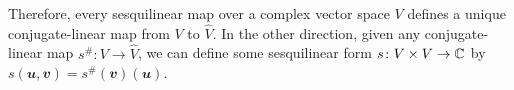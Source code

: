 \documentclass[math, code]{amznotes}
\makeatletter
\let\save@mathaccent\mathaccent
\newcommand*\if@single[3]{%
  \setbox0\hbox{${\mathaccent"0362{#1}}^H$}%
  \setbox2\hbox{${\mathaccent"0362{\kern0pt#1}}^H$}%
  \ifdim\ht0=\ht2 #3\else #2\fi
  }
\newcommand*\rel@kern[1]{\kern#1\dimexpr\macc@kerna}
\newcommand*\widebar[1]{\@ifnextchar^{{\wide@bar{#1}{0}}}{\wide@bar{#1}{1}}}
\newcommand*\wide@bar[2]{\if@single{#1}{\wide@bar@{#1}{#2}{1}}{\wide@bar@{#1}{#2}{2}}}
\newcommand*\wide@bar@[3]{%
  \begingroup
  \def\mathaccent##1##2{%
    \let\mathaccent\save@mathaccent
    \if#32 \let\macc@nucleus\first@char \fi
    \setbox\z@\hbox{$\macc@style{\macc@nucleus}_{}$}%
    \setbox\tw@\hbox{$\macc@style{\macc@nucleus}{}_{}$}%
    \dimen@\wd\tw@
    \advance\dimen@-\wd\z@
    \divide\dimen@ 3
    \@tempdima\wd\tw@
    \advance\@tempdima-\scriptspace
    \divide\@tempdima 10
    \advance\dimen@-\@tempdima
    \ifdim\dimen@>\z@ \dimen@0pt\fi
    \rel@kern{0.6}\kern-\dimen@
    \if#31
      \overline{\rel@kern{-0.6}\kern\dimen@\macc@nucleus\rel@kern{0.4}\kern\dimen@}%
      \advance\dimen@0.4\dimexpr\macc@kerna
      \let\final@kern#2%
      \ifdim\dimen@<\z@ \let\final@kern1\fi
      \if\final@kern1 \kern-\dimen@\fi
    \else
      \overline{\rel@kern{-0.6}\kern\dimen@#1}%
    \fi
  }%
  \macc@depth\@ne
  \let\math@bgroup\@empty \let\math@egroup\macc@set@skewchar
  \mathsurround\z@ \frozen@everymath{\mathgroup\macc@group\relax}%
  \macc@set@skewchar\relax
  \let\mathaccentV\macc@nested@a
  \if#31
    \macc@nested@a\relax111{#1}%
  \else
    \def\gobble@till@marker##1\endmarker{}%
    \futurelet\first@char\gobble@till@marker#1\endmarker
    \ifcat\noexpand\first@char A\else
      \def\first@char{}%
    \fi
    \macc@nested@a\relax111{\first@char}%
  \fi
  \endgroup
}
\theoremstyle{remark}
\makeatother
\begin{document}
    Therefore, every sesquilinear map over a complex vector space $V$ defines a unique conjugate-linear map from $V$ to $\widehat{V}$. In the other direction, given any conjugate-linear map $s^{\#} \colon V \to \widehat{V}$, we can define some sesquilinear form $s \colon V \times V \to \mathbb{C}$ by $s(\mathbfit{u}, \mathbfit{v}) = s^{\#}(\mathbfit{v})(\mathbfit{u})$.
\end{document}
